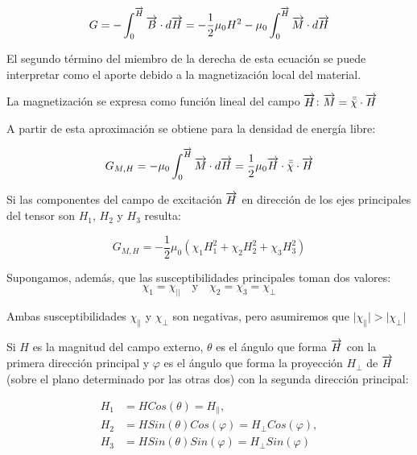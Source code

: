 \begin{equation}
	\label{eq:612}
	G = -\int_{0}^{\overrightarrow{H}}\overrightarrow{B}\cdot d \overrightarrow{H}=
	-\dfrac{1}{2}\mu_{0}H^{2}-\mu_{0}\int_{0}^{\overrightarrow{H}}\overrightarrow{M} \cdot d \overrightarrow{H}
\end{equation}

El segundo término del miembro de la derecha de esta ecuación se puede interpretar como el aporte debido a la magnetización local del material.

La magnetización se expresa como función lineal del campo $\overrightarrow{H}$: $\overrightarrow{M}= \bar{\bar{\chi}} \cdot \overrightarrow{H}$

A partir de esta aproximación se obtiene para la densidad de energía libre:

\begin{equation}
	\label{eq:613}
	G_{M,H} = -\mu_{0}\int_{0}^{\overrightarrow{H}}\overrightarrow{M} \cdot d \overrightarrow{H}= \dfrac{1}{2}\mu_{0}\overrightarrow{H}\cdot \bar{\bar{\chi}} \cdot \overrightarrow{H}
\end{equation}

Si las componentes del campo de excitación $\overrightarrow{H}$ en dirección de los ejes principales del tensor son $H_{1}$, $H_{2}$ y $H_{3}$ resulta:

\begin{equation}
	\label{eq:614}
	G_{M,H} = -\dfrac{1}{2}\mu_{0}(\chi_{1}H_{1}^{2}+\chi_{2}H_{2}^{2}+\chi_{3}H_{3}^{2})
\end{equation}

Supongamos, además, que las susceptibilidades principales toman dos valores:
\begin{equation}
	\label{eq:615}
	\chi_{1}= \chi_{\vert\vert} \quad \text{y} \quad \chi_{2}=\chi_{3}=\chi_{\perp}
\end{equation}

Ambas susceptibilidades $\chi_{\parallel}$ y $\chi_{\perp}$ son negativas, pero asumiremos que 
$\vert \chi_{\parallel} \vert > \vert \chi_{\perp} \vert$

Si $H$ es la magnitud del campo externo, $\theta$ es el ángulo que forma $\overrightarrow{H}$ con la primera dirección principal y $\varphi$ es el ángulo que forma la proyección $H_{\perp}$ de $\overrightarrow{H}$ (sobre el plano determinado por las otras dos) con la segunda dirección principal:

\begin{equation}
\begin{aligned}
	\label{eq:616}
	H_{1} &= HCos(\theta)= H_{\parallel},\\
	H_{2} &= HSin(\theta)Cos(\varphi) = H_{\perp}Cos(\varphi),\\
	H_{3} & =HSin(\theta)Sin(\varphi) = H_{\perp}Sin(\varphi)
\end{aligned}
\end{equation}


